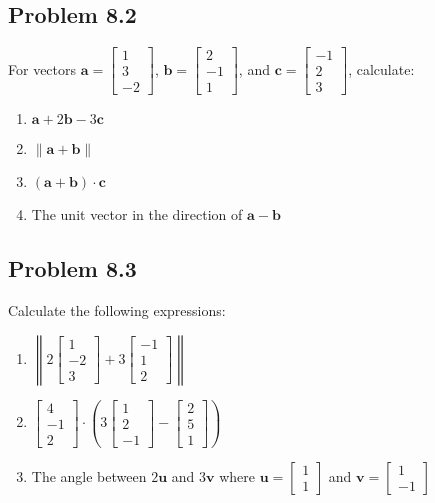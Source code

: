 \documentclass{article}
\begin{document}
\subsection{Problem 8.2}
For vectors $\mathbf{a} = \begin{bmatrix} 1 \\ 3 \\ -2 \end{bmatrix}$, $\mathbf{b} = \begin{bmatrix} 2 \\ -1 \\ 1 \end{bmatrix}$, and $\mathbf{c} = \begin{bmatrix} -1 \\ 2 \\ 3 \end{bmatrix}$, calculate:
\begin{enumerate}
\item $\mathbf{a} + 2\mathbf{b} - 3\mathbf{c}$
\item $\|\mathbf{a} + \mathbf{b}\|$
\item $(\mathbf{a} + \mathbf{b}) \cdot \mathbf{c}$
\item The unit vector in the direction of $\mathbf{a} - \mathbf{b}$
\end{enumerate}

\subsection{Problem 8.3}
Calculate the following expressions:
\begin{enumerate}
\item $\left\|2\begin{bmatrix} 1 \\ -2 \\ 3 \end{bmatrix} + 3\begin{bmatrix} -1 \\ 1 \\ 2 \end{bmatrix}\right\|$
\item $\begin{bmatrix} 4 \\ -1 \\ 2 \end{bmatrix} \cdot \left(3\begin{bmatrix} 1 \\ 2 \\ -1 \end{bmatrix} - \begin{bmatrix} 2 \\ 5 \\ 1 \end{bmatrix}\right)$
\item The angle between $2\mathbf{u}$ and $3\mathbf{v}$ where $\mathbf{u} = \begin{bmatrix} 1 \\ 1 \end{bmatrix}$ and $\mathbf{v} = \begin{bmatrix} 1 \\ -1 \end{bmatrix}$
\end{enumerate}
\end{document}
